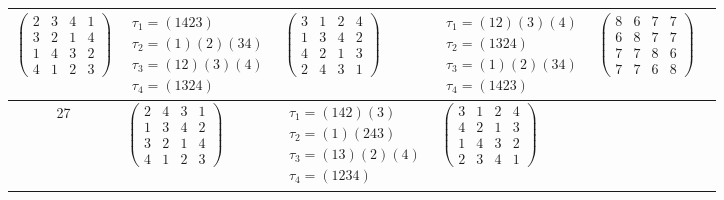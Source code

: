 \begin{longtable}{|c|p{2.7cm}|p{2.7cm}|p{2.7cm}|p{2.7cm}|p{2.7cm}|}
    $\begin{pmatrix} 2 & 3 & 4 & 1 \\ 3 & 2 & 1 & 4 \\ 1 & 4 & 3 & 2 \\ 4 & 1 & 2 & 3 \end{pmatrix}$               &
    $\begin{array}{l}\tau_{1}=(1423)\\ \tau_{2}=(1)(2)(34)\\ \tau_{3}=(12)(3)(4)\\ \tau_{4}=(1324)\end{array}$     &
    $\begin{pmatrix} 3 & 1 & 2 & 4 \\ 1 & 3 & 4 & 2 \\ 4 & 2 & 1 & 3 \\ 2 & 4 & 3 & 1 \end{pmatrix}$               &
    $\begin{array}{l}\tau_{1}=(12)(3)(4)\\ \tau_{2}=(1324)\\ \tau_{3}=(1)(2)(34)\\ \tau_{4}=(1423)\end{array}$     &
    $\begin{pmatrix} 8 & 6 & 7 & 7 \\ 6 & 8 & 7 & 7 \\ 7 & 7 & 8 & 6 \\ 7 & 7 & 6 & 8 \end{pmatrix}$                                                                                           \\
    \hline
    27                                                                                                             &
    $\begin{pmatrix} 2 & 4 & 3 & 1 \\ 1 & 3 & 4 & 2 \\ 3 & 2 & 1 & 4 \\ 4 & 1 & 2 & 3 \end{pmatrix}$               &
    $\begin{array}{l}\tau_{1}=(142)(3)\\ \tau_{2}=(1)(243)\\ \tau_{3}=(13)(2)(4)\\ \tau_{4}=(1234)\end{array}$     &
    $\begin{pmatrix} 3 & 1 & 2 & 4 \\ 4 & 2 & 1 & 3 \\ 1 & 4 & 3 & 2 \\ 2 & 3 & 4 & 1 \end{pmatrix}$               &

\end{longtable}

